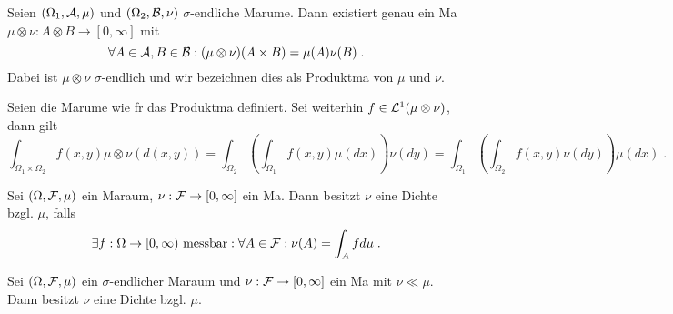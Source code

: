 \begin{theorem}[Produktma\s]
	Seien \((\Omega_1, \mathcal{A}, \mu)\) und \((\Omega_2, \mathcal{B}, \nu)\) $\sigma$-endliche Ma\s r\as ume. Dann existiert genau ein Ma\s{} \(\mu\otimes\nu: A\otimes B \to [0,\infty]\) mit 
	\[\forall A \in \mathcal{A}, B\in\mathcal{B}: (\mu \otimes \nu)(A\times B) = \mu(A) \nu(B)\;.\]
	Dabei ist \(\mu\otimes \nu\) $\sigma$-endlich und wir bezeichnen dies als Produktma\s{} von \(\mu\) und \(\nu\).
\end{theorem}

\begin{theorem}
	\label{Fubini}
	Seien die Ma\s r\as ume wie f\us r das Produktma\s{} definiert. Sei weiterhin \(f\in \mathcal{L}^1(\mu\otimes \nu)\), dann gilt
	\[\int_{\Omega_1\times \Omega_2} f(x,y) \mu \otimes \nu(d(x,y)) = \int_{\Omega_2}\left(\int_{\Omega_1} f(x,y) \mu (dx)\right) \nu(dy) = \int_{\Omega_1}\left(\int_{\Omega_2} f(x,y) \nu (dy)\right) \mu(dx)\;.\]
\end{theorem}

\begin{definition}
	Sei \((\Omega, \mathcal{F}, \mu)\) ein Ma\s raum, \(\nu: \mathcal{F} \to [0,\infty]\) ein Ma\s{}. Dann besitzt $\nu$ eine Dichte bzgl. $\mu$, falls
	\[\exists f:\Omega \to [0,\infty) \text{ messbar}: \forall A \in \mathcal{F}: \nu(A) = \int_A f d\mu\;.\]
\end{definition}

\begin{theorem} \label{radon_nikodym} Sei \((\Omega, \mathcal{F}, \mu)\) ein $\sigma$-endlicher Ma\s raum und \(\nu: \mathcal{F} \to [0,\infty]\) ein Ma\s{} mit \(\nu \ll\mu\). Dann besitzt \(\nu\) eine Dichte bzgl. $\mu$.
\end{theorem}



